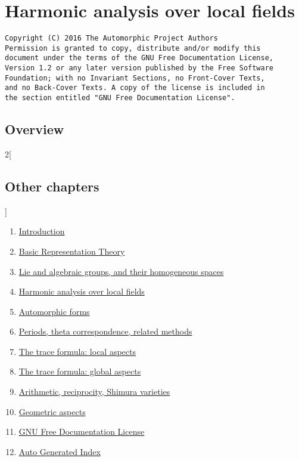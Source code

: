 \documentclass{stacks-project-book}
\theoremstyle{plain}
\theoremstyle{definition}
\theoremstyle{remark}
\numberwithin{equation}{subsection}
\begin{document}
%

\chapter{Harmonic analysis over local fields}



\label{harmonicanalysis-section-phantom}

\begin{verbatim}
Copyright (C) 2016 The Automorphic Project Authors
Permission is granted to copy, distribute and/or modify this
document under the terms of the GNU Free Documentation License,
Version 1.2 or any later version published by the Free Software
Foundation; with no Invariant Sections, no Front-Cover Texts,
and no Back-Cover Texts. A copy of the license is included in
the section entitled "GNU Free Documentation License".
\end{verbatim}



\section{Overview}
\label{harmonicanalysis-section-overview}




\begin{multicols}{2}[\section{Other chapters}]
\noindent
\begin{enumerate}
\item \hyperref[introduction-section-phantom]{Introduction}
\item \hyperref[representationtheory-section-phantom]{Basic Representation Theory}
\item \hyperref[algebraicgroups-section-phantom]{Lie and algebraic groups, and their homogeneous spaces}
\item \hyperref[harmonicanalysis-section-phantom]{Harmonic analysis over local fields}
\item \hyperref[automorphicforms-section-phantom]{Automorphic forms}
\item \hyperref[periods-section-phantom]{Periods, theta correspondence, related methods}
\item \hyperref[traceformulalocal-section-phantom]{The trace formula: local aspects}
\item \hyperref[traceformulaglobal-section-phantom]{The trace formula: global aspects}
\item \hyperref[arithmetic-section-phantom]{Arithmetic, reciprocity, Shimura varieties}
\item \hyperref[geometric-section-phantom]{Geometric aspects}
\item \hyperref[fdl-section-phantom]{GNU Free Documentation License}
\item \hyperref[index-section-phantom]{Auto Generated Index}
\end{enumerate}
\end{multicols}
\end{document}
